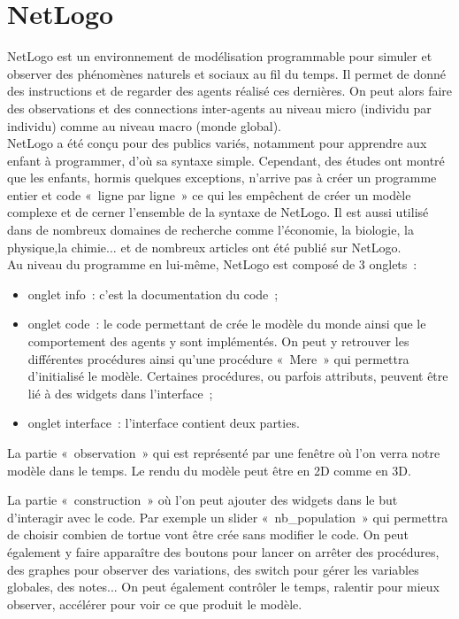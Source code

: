 \section{NetLogo}

NetLogo est un environnement de modélisation programmable pour simuler et observer des phénomènes naturels et sociaux au fil du temps. Il permet de donné des instructions et de regarder des agents réalisé ces dernières. On peut alors faire des observations et des connections inter-agents au niveau micro (individu par individu) comme au niveau macro (monde global).\\
NetLogo a été conçu pour des publics variés, notamment pour apprendre aux enfant à programmer, d'où sa syntaxe simple. Cependant, des études ont montré que les enfants, hormis quelques exceptions, n'arrive pas à créer un programme entier et code «~ligne par ligne~» ce qui les empêchent de créer un modèle complexe et de cerner l'ensemble de la syntaxe de NetLogo.
Il est aussi utilisé dans de nombreux domaines de recherche comme l'économie, la biologie, la physique,la chimie... et de nombreux articles ont été publié sur NetLogo.
\\

Au niveau du programme en lui-même, NetLogo est composé de 3 onglets~: 
\begin{itemize}
	\item onglet info~: c'est la documentation du code~;
	\item onglet code~: le code permettant de crée le modèle du monde ainsi que le comportement des agents y sont implémentés. On peut y retrouver les différentes procédures ainsi qu'une procédure «~Mere~» qui permettra d'initialisé le modèle. Certaines procédures, ou parfois attributs, peuvent être lié à des widgets dans l'interface~;
	\item onglet interface~: l'interface contient deux parties.
\end{itemize}


La partie «~observation~» qui est représenté par une fenêtre où l'on verra notre modèle dans le temps. Le rendu du modèle peut être en 2D comme en 3D.

La partie «~construction~» où l'on peut ajouter des widgets dans le but d’interagir avec le code. Par exemple un slider «~nb\_population~» qui permettra de choisir combien de tortue vont être crée sans modifier le code. On peut également y faire apparaître des boutons pour lancer on arrêter des procédures, des graphes pour observer des variations, des switch pour gérer les variables globales, des notes... On peut également contrôler le temps, ralentir pour mieux observer, accélérer pour voir ce que produit le modèle.
\\

